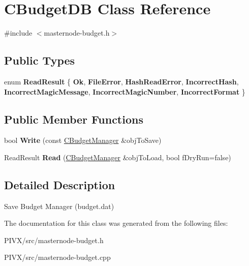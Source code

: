 \hypertarget{class_c_budget_d_b}{}\section{C\+Budget\+DB Class Reference}
\label{class_c_budget_d_b}


{\ttfamily \#include $<$masternode-\/budget.\+h$>$}

\subsection*{Public Types}
\begin{DoxyCompactItemize}
\item 
\mbox{\label{class_c_budget_d_b_a53586703b6648c7cabbf9cdcfef5f7d9}} 
enum {\bfseries Read\+Result} \{ \newline
{\bfseries Ok}, 
{\bfseries File\+Error}, 
{\bfseries Hash\+Read\+Error}, 
{\bfseries Incorrect\+Hash}, 
\newline
{\bfseries Incorrect\+Magic\+Message}, 
{\bfseries Incorrect\+Magic\+Number}, 
{\bfseries Incorrect\+Format}
 \}
\end{DoxyCompactItemize}
\subsection*{Public Member Functions}
\begin{DoxyCompactItemize}
\item 
\mbox{\label{class_c_budget_d_b_a7c9bd15eefe04f87e822cc1bc0887b76}} 
bool {\bfseries Write} (const \mbox{\hyperlink{class_c_budget_manager}{C\+Budget\+Manager}} \&obj\+To\+Save)
\item 
\mbox{\label{class_c_budget_d_b_aecdde2af475070d9fafdcacf93f2e4f2}} 
Read\+Result {\bfseries Read} (\mbox{\hyperlink{class_c_budget_manager}{C\+Budget\+Manager}} \&obj\+To\+Load, bool f\+Dry\+Run=false)
\end{DoxyCompactItemize}


\subsection{Detailed Description}
Save Budget Manager (budget.\+dat) 

The documentation for this class was generated from the following files\+:\begin{DoxyCompactItemize}
\item 
P\+I\+V\+X/src/masternode-\/budget.\+h\item 
P\+I\+V\+X/src/masternode-\/budget.\+cpp\end{DoxyCompactItemize}
